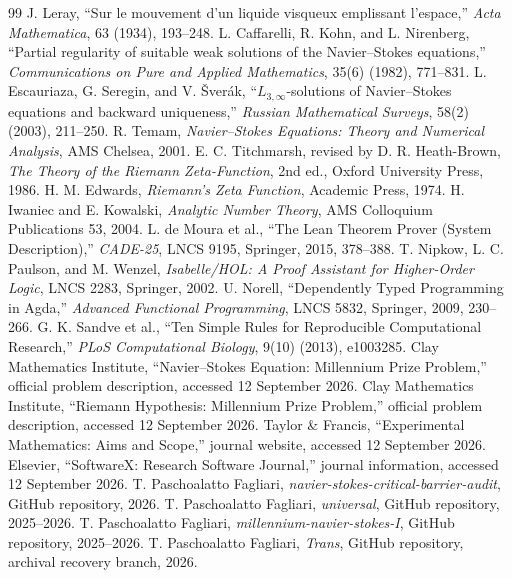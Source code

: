 \documentclass[11pt]{article}
\begin{document}
\begin{thebibliography}{99}
 J. Leray, ``Sur le mouvement d'un liquide visqueux emplissant l'espace,'' \emph{Acta Mathematica}, 63 (1934), 193--248.
 L. Caffarelli, R. Kohn, and L. Nirenberg, ``Partial regularity of suitable weak solutions of the Navier--Stokes equations,'' \emph{Communications on Pure and Applied Mathematics}, 35(6) (1982), 771--831.
 L. Escauriaza, G. Seregin, and V. \v{S}ver\'ak, ``$L_{3,\infty}$-solutions of Navier--Stokes equations and backward uniqueness,'' \emph{Russian Mathematical Surveys}, 58(2) (2003), 211--250.
 R. Temam, \emph{Navier--Stokes Equations: Theory and Numerical Analysis}, AMS Chelsea, 2001.
 E. C. Titchmarsh, revised by D. R. Heath-Brown, \emph{The Theory of the Riemann Zeta-Function}, 2nd ed., Oxford University Press, 1986.
 H. M. Edwards, \emph{Riemann's Zeta Function}, Academic Press, 1974.
 H. Iwaniec and E. Kowalski, \emph{Analytic Number Theory}, AMS Colloquium Publications 53, 2004.
 L. de Moura et al., ``The Lean Theorem Prover (System Description),'' \emph{CADE-25}, LNCS 9195, Springer, 2015, 378--388.
 T. Nipkow, L. C. Paulson, and M. Wenzel, \emph{Isabelle/HOL: A Proof Assistant for Higher-Order Logic}, LNCS 2283, Springer, 2002.
 U. Norell, ``Dependently Typed Programming in Agda,'' \emph{Advanced Functional Programming}, LNCS 5832, Springer, 2009, 230--266.
 G. K. Sandve et al., ``Ten Simple Rules for Reproducible Computational Research,'' \emph{PLoS Computational Biology}, 9(10) (2013), e1003285.
 Clay Mathematics Institute, ``Navier--Stokes Equation: Millennium Prize Problem,'' official problem description, accessed 12 September 2026.
 Clay Mathematics Institute, ``Riemann Hypothesis: Millennium Prize Problem,'' official problem description, accessed 12 September 2026.
 Taylor \& Francis, ``Experimental Mathematics: Aims and Scope,'' journal website, accessed 12 September 2026.
 Elsevier, ``SoftwareX: Research Software Journal,'' journal information, accessed 12 September 2026.
 T. Paschoalatto Fagliari, \emph{navier-stokes-critical-barrier-audit}, GitHub repository, 2026.
 T. Paschoalatto Fagliari, \emph{universal}, GitHub repository, 2025--2026.
 T. Paschoalatto Fagliari, \emph{millennium-navier-stokes-I}, GitHub repository, 2025--2026.
 T. Paschoalatto Fagliari, \emph{Trans}, GitHub repository, archival recovery branch, 2026.
\end{thebibliography}
\end{document}
